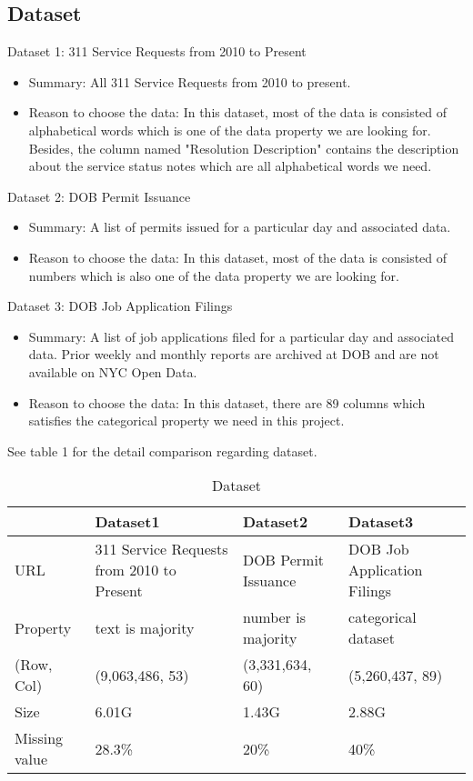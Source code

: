\documentclass[sigconf]{acmart}
\begin{document}
\subsection{Dataset}
Dataset 1: 311 Service Requests from 2010 to Present
\begin{itemize}
	\item{Summary: All 311 Service Requests from 2010 to present.}
	\item{Reason to choose the data: In this dataset, most of the data is consisted of alphabetical words which is one of the data property we are looking for. Besides, the column named "Resolution Description" contains the description about the service status notes which are all alphabetical words we need. }
\end{itemize}
Dataset 2: DOB Permit Issuance
\begin{itemize}
	\item{Summary: A list of permits issued for a particular day and associated data.}
	\item{Reason to choose the data: In this dataset, most of the data is consisted of numbers which is also one of the data property we are looking for.}
\end{itemize}
Dataset 3: DOB Job Application Filings
\begin{itemize}
	\item{Summary: A list of job applications filed for a particular day and associated data. Prior weekly and monthly reports are archived at DOB and are not available on NYC Open Data.}
	\item{Reason to choose the data: In this dataset, there are 89 columns which satisfies the categorical property we need in this project.}
	\end{itemize}
	See table 1 for the detail comparison regarding dataset.

\begin{table} [h]
\small
\centering
\caption{Dataset}   
\begin{tabular}{|p{1.7cm}|p{2cm}|p{2cm}|p{2cm}|} 
\hline  
& Dataset1 & Dataset2 & Dataset3\\ \hline  
URL & 311 Service Requests from 2010 to Present\cite{nycopendata1}& DOB Permit Issuance\cite{nycopendata2}&DOB Job Application Filings\cite{nycopendata3}\\  \hline
Property & text is majority&number is majority&categorical dataset\\ \hline
(Row, Col) &(9,063,486, 53)&(3,331,634, 60)&(5,260,437, 89)\\  \hline
Size&6.01G & 1.43G & 2.88G\\ \hline
Missing value&28.3\%&20\%&40\%\\
\hline  
\end{tabular}   
\end{table}
\end{document}
